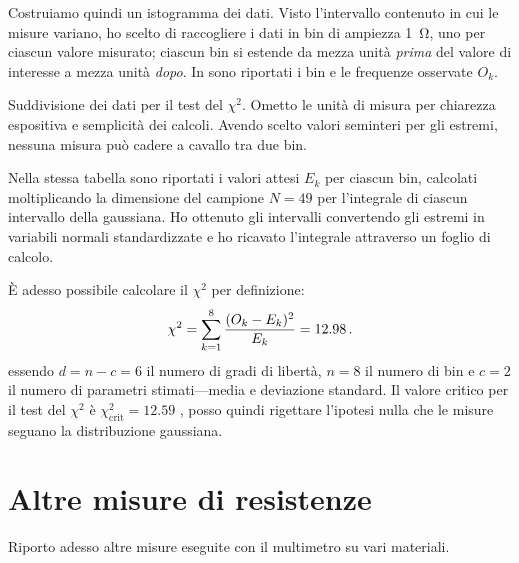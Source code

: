             Costruiamo quindi un istogramma dei dati. Visto l'intervallo contenuto in cui le misure variano, ho scelto di raccogliere i dati in bin di ampiezza \SI{1}{\ohm}, uno per ciascun valore misurato; ciascun bin si estende da mezza unità \emph{prima} del valore di interesse a mezza unità \emph{dopo}. In  sono riportati i bin e le frequenze osservate $O_k$.
            \begin{table}
                \centering
                
                \caption{Suddivisione dei dati per il test del $\chi^2$. Ometto le unità di misura per chiarezza espositiva e semplicità dei calcoli. Avendo scelto valori seminteri per gli estremi, nessuna misura può cadere a cavallo tra due bin.}
                \label{tab:mul:bin-istogramma}
            \end{table}

            Nella stessa tabella sono riportati i valori attesi $E_k$ per ciascun bin, calcolati moltiplicando la dimensione del campione $N = 49$ per l'integrale di ciascun intervallo della gaussiana. Ho ottenuto gli intervalli convertendo gli estremi in variabili normali standardizzate e ho ricavato l'integrale attraverso un foglio di calcolo.

            È adesso possibile calcolare il $\chi^2$ per definizione:
            \begin{equation*}
                \chi^2
                = \sum_{k=1}^{8} \frac{(O_k - E_k)^2}{E_k}
                = \num{12.98}
                \,.
            \end{equation*}
            essendo $d = n - c = 6$ il numero di gradi di libertà, $n = 8$ il numero di bin e $c = 2$ il numero di parametri stimati---media e deviazione standard. Il valore critico per il test del $\chi^2$ è $\chi^2_\text{crit}= \num{12.59}$ \cite{chi2-table}, posso quindi rigettare l'ipotesi nulla che le misure seguano la distribuzione gaussiana.

    \section{Altre misure di resistenze}
        Riporto adesso altre misure eseguite con il multimetro su vari materiali.
        

